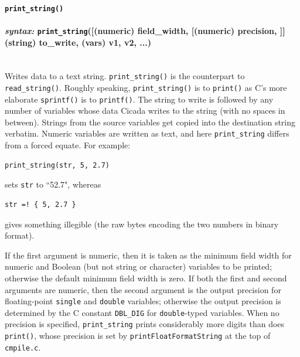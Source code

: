 \documentclass{article}
\newenvironment{code}{
       \begin{list}{}{
               \setlength{\leftmargin}{.4in}
               \setlength{\rightmargin}{0in}
               \setlength{\topsep}{.2in}
       }
       \small
       \item[] }
       { \end{list}   }
\begin{document}
 






\paragraph{\texttt{print\_string()}\\\\
\normalfont \emph{syntax: } \texttt{print\_string}([(numeric) field\_width, [(numeric) precision, ]] (string) to\_write, (vars) v1, v2, ...)\\\\}
  

Writes data to a text string.  \texttt{print\_string()} is the counterpart to \texttt{read\_string()}.  Roughly speaking, \texttt{print\_string()} is to \texttt{print()} as C's more elaborate \texttt{sprintf()} is to \texttt{printf()}.  The string to write is followed by any number of variables whose data Cicada writes to the string (with no spaces in between).  Strings from the source variables get copied into the destination string verbatim.  Numeric variables are written as text, and here \texttt{print\_string} differs from a forced equate.  For example: 

\begin{code} \begin{verbatim}
print_string(str, 5, 2.7)
\end{verbatim} \end{code}

\noindent sets \texttt{str} to ``52.7", whereas

\begin{code} \begin{verbatim}
str =! { 5, 2.7 }
\end{verbatim} \end{code}

\noindent gives something illegible (the raw bytes encoding the two numbers in binary format).

If the first argument is numeric, then it is taken as the minimum field width for numeric and Boolean (but not string or character) variables to be printed; otherwise the default minimum field width is zero.  If both the first and second arguments are numeric, then the second argument is the output precision for floating-point \texttt{single} and \texttt{double} variables; otherwise the output precision is determined by the C constant \texttt{DBL\_DIG} for \texttt{double}-typed variables.  When no precision is specified, \texttt{print\_string} prints considerably more digits than does \texttt{print()}, whose precision is set by \verb#printFloatFormatString# at the top of \verb#cmpile.c#.\\
\end{document}
